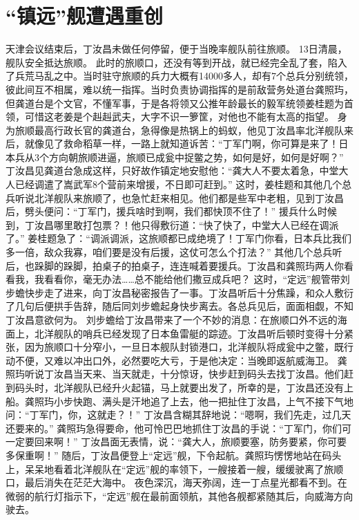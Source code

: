 \documentclass[12pt,UTF8]{ctexbook}
\begin{document}
\chapter{“镇远”舰遭遇重创}

天津会议结束后，丁汝昌未做任何停留，便于当晚率舰队前往旅顺。
13日清晨，舰队安全抵达旅顺。
此时的旅顺口，还没有等到开战，就已经完全乱了套，陷入了兵荒马乱之中。当时驻守旅顺的兵力大概有14000多人，却有7个总兵分别统领，彼此间互不相属，难以统一指挥。当时负责协调指挥的是前敌营务处道台龚照玙，但龚道台是个文官，不懂军事，于是各将领又公推年龄最长的毅军统领姜桂题为首领，可惜这老姜是个赳赳武夫，大字不识一箩筐，对他也不能有太高的指望。
身为旅顺最高行政长官的龚道台，急得像是热锅上的蚂蚁，他见丁汝昌率北洋舰队来后，就像见了救命稻草一样，一路上就知道诉苦：“丁军门啊，你可算是来了！日本兵从3个方向朝旅顺进逼，旅顺已成瓮中捉鳖之势，如何是好，如何是好啊？”
丁汝昌见龚道台急成这样，只好故作镇定地安慰他：“龚大人不要太着急，中堂大人已经调遣了嵩武军8个营前来增援，不日即可赶到。”
这时，姜桂题和其他几个总兵听说北洋舰队来旅顺了，也急忙赶来相见。他们都是些军中老粗，见到丁汝昌后，劈头便问：“丁军门，援兵啥时到啊，我们都快顶不住了！”
援兵什么时候到，丁汝昌哪里敢打包票？！他只得敷衍道：“快了快了，中堂大人已经在调派了。”
姜桂题急了：“调派调派，这旅顺都已成绝境了！丁军门你看，日本兵比我们多一倍，敌众我寡，咱们要是没有后援，这仗可怎么个打法？”
其他几个总兵听后，也跺脚的跺脚，拍桌子的拍桌子，连连喊着要援兵。丁汝昌和龚照玙两人你看看我，我看看你，毫无办法……总不能给他们撒豆成兵吧？
这时，“定远”舰管带刘步蟾快步走了进来，向丁汝昌秘密报告了一事。丁汝昌听后十分焦躁，和众人敷衍了几句后便拱手告辞，随后同刘步蟾起身快步离去。各总兵见后，面面相觑，不知丁汝昌意欲何为。
刘步蟾给丁汝昌带来了一个不妙的消息：在旅顺口外不远的海面上，北洋舰队的哨兵已经发现了日本鱼雷艇的踪迹。丁汝昌听后顿时变得十分紧张，因为旅顺口十分窄小，一旦日本舰队封锁港口，北洋舰队将成瓮中之鳖，既行动不便，又难以冲出口外，必然要吃大亏，于是他决定：当晚即返航威海卫。
龚照玙听说丁汝昌当天来、当天就走，十分惊讶，快步赶到码头去找丁汝昌。他们赶到码头时，北洋舰队已经升火起锚，马上就要出发了，所幸的是，丁汝昌还没有上船。龚照玙小步快跑、满头是汗地追了上去，他一把扯住丁汝昌，上气不接下气地问：“丁军门，你，这就走？！”
丁汝昌含糊其辞地说：“嗯啊，我们先走，过几天还要来的。”
龚照玙急得要命，他可怜巴巴地抓住丁汝昌的手说：“丁军门，你们可一定要回来啊！”
丁汝昌面无表情，说：“龚大人，旅顺要塞，防务要紧，你可要多保重啊！”
随后，丁汝昌便登上“定远”舰，下令起航。龚照玙愣愣地站在码头上，呆呆地看着北洋舰队在“定远”舰的率领下，一艘接着一艘，缓缓驶离了旅顺口，最后消失在茫茫大海中。
夜色深沉，海天弥阔，连一丁点星光都看不到。在微弱的航行灯指示下，“定远”舰在最前面领航，其他各舰都紧随其后，向威海方向驶去。
\end{document}
